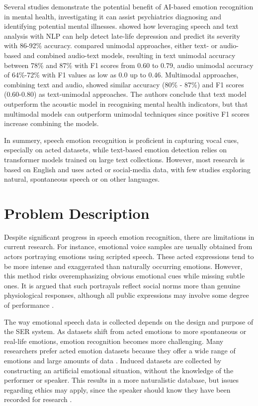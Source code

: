 Several studies \autocite{DeSouza2021, Drougkas2024, Simcock2020,Singh2023} demonstrate the potential benefit of AI-based emotion recognition in mental health, investigating it can assist psychiatrics diagnosing and identifying potential mental illnesses. \textcite{DeSouza2021} showed how leveraging speech and text analysis with NLP can help detect late-life depression and predict its severity with 86-92\% accuracy.
\textcite{Drougkas2024} compared unimodal approaches, either text- or audio-based and combined audio-text models, resulting in text unimodal accuracy between 78\% and 87\% with F1 scores from 0.60 to 0.79, audio unimodal accuracy of 64\%-72\% with F1 values as low as 0.0 up to 0.46. Multimodal approaches, combining text and audio, showed similar accuracy (80\% - 87\%) and F1 scores (0.60-0.80) as text-unimodal approaches. The authors conclude that text model outperform the acoustic model in recognising mental health indicators, but that multimodal models can outperform unimodal techniques since positive F1 scores increase combining the models. 

In summery, speech emotion recognition is proficient in capturing vocal cues, especially on acted datasets, while text-based emotion detection relies on transformer models trained on large text collections. However, most research is based on English and uses acted or social-media data, with few studies exploring natural, spontaneous speech or on other languages.  


\section{Problem Description}
Despite significant progress in speech emotion recognition, there are limitations in current research. For instance, emotional voice samples are usually obtained from actors portraying emotions using scripted speech. These acted expressions tend to be more intense and exaggerated than naturally occurring emotions. However, this method risks overemphasizing obvious emotional cues while missing subtle ones. It is argued that such portrayals reflect social norms more than genuine physiological responses, although all public expressions may involve some degree of performance \autocite{Scherer2018}.

The way emotional speech data is collected depends on the design and purpose of the SER system. As datasets shift from acted emotions to more spontaneous or real-life emotions, emotion recognition becomes more challenging. Many researchers prefer acted emotion datasets because they offer a wide range of emotions and large amounts of data \autocite{Rathi2024}. Induced datasets are collected by constructing an artificial emotional situation, without the knowledge of the performer or speaker. This results in a more naturalistic database, but issues regarding ethics may apply, since the speaker should know they have been recorded for research \autocite{Khalil2019}. 

